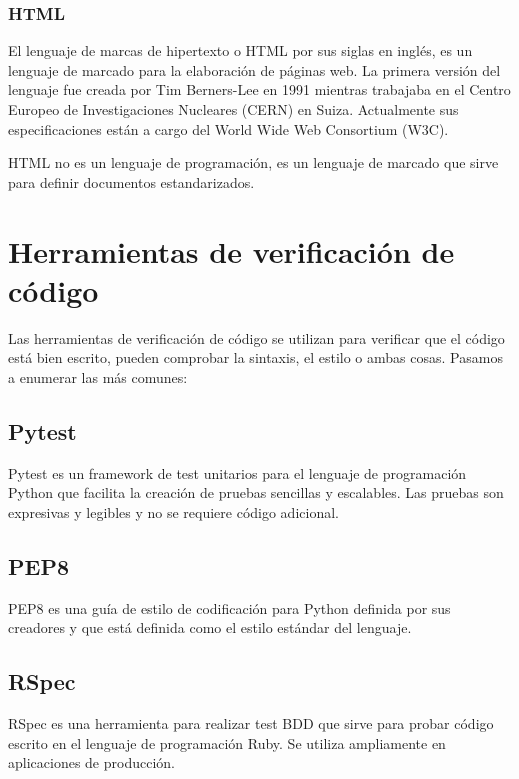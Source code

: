 \subsubsection{HTML}

El lenguaje de marcas de hipertexto o HTML por sus siglas en inglés, es un lenguaje de marcado para la elaboración de páginas web. La primera versión del lenguaje fue creada por Tim Berners-Lee en 1991 mientras trabajaba en el Centro Europeo de Investigaciones Nucleares (CERN) en Suiza. Actualmente sus especificaciones están a cargo del World Wide Web Consortium (W3C).

\bigskip
HTML no es un lenguaje de programación, es un lenguaje de marcado que sirve para definir documentos estandarizados.


\section {Herramientas de verificación de código}

Las herramientas de verificación de código se utilizan para verificar que el código está bien escrito, pueden comprobar la sintaxis, el estilo o ambas cosas. Pasamos a enumerar las más comunes:

\subsection {Pytest}

Pytest es un framework de test unitarios para el lenguaje de programación Python que facilita la creación de pruebas sencillas y escalables. Las pruebas son expresivas y legibles y no se requiere código adicional.

\subsection {PEP8}

PEP8 es una guía de estilo de codificación para Python definida por sus creadores y que está definida como el estilo estándar del lenguaje.

\subsection {RSpec}

RSpec es una herramienta para realizar test BDD que sirve para probar código escrito en el lenguaje de programación Ruby. Se utiliza ampliamente en aplicaciones de producción.

